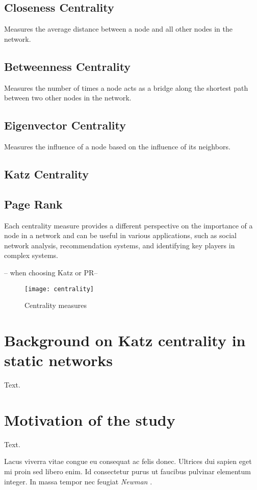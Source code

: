 \subsection*{Closeness Centrality} Measures the average distance between a node and all other nodes in the network.

\subsection*{Betweenness Centrality} Measures the number of times a node acts as a bridge along the shortest path between two other nodes in the network.

\subsection*{Eigenvector Centrality} Measures the influence of a node based on the influence of its neighbors.

\subsection*{Katz Centrality}

\subsection*{Page Rank}

Each centrality measure provides a different perspective on the importance of a node in a network and can be useful in various applications, such as social network analysis, recommendation systems, and identifying key players in complex systems.

-- when choosing Katz or PR--

\begin{figure}[htbp]\centering
	\texttt{[image: centrality]}
	\caption{Centrality measures}
	\label{centrality}
	\bigskip
\end{figure}

\section{Background on Katz centrality in static networks}
\label{sec:back}
Text.

\section{Motivation of the study}
\label{sec:motiv}
Text.


Lacus viverra vitae congue eu consequat ac felis donec. Ultrices dui sapien eget mi proin sed libero enim. Id consectetur purus ut faucibus pulvinar elementum integer. In massa tempor nec feugiat \textsl{Newman} \cite{newman2018networks}.
